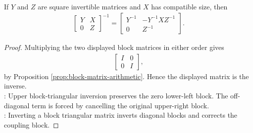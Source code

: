 \begin{proposition} \label{prop:block-upper-triangular-inverse} \\
If $Y$ and $Z$ are square invertible matrices and $X$ has compatible size, then
\begin{align}
\begin{bmatrix}
Y & X\\
0 & Z
\end{bmatrix}^{-1}
=
\begin{bmatrix}
Y^{-1} & -Y^{-1}XZ^{-1}\\
0 & Z^{-1}
\end{bmatrix}.
\nonumber
\end{align}
\begin{proof}
Multiplying the two displayed block matrices in either order gives
\begin{align}
\begin{bmatrix}
I & 0\\
0 & I
\end{bmatrix},
\nonumber
\end{align}
by Proposition \ref{prop:block-matrix-arithmetic}. Hence the displayed matrix is the inverse.\\
: Upper block-triangular inversion preserves the zero lower-left block. The off-diagonal term is forced by cancelling the original upper-right block.\\
: Inverting a block triangular matrix inverts diagonal blocks and corrects the coupling block.
\end{proof}
\end{proposition}

